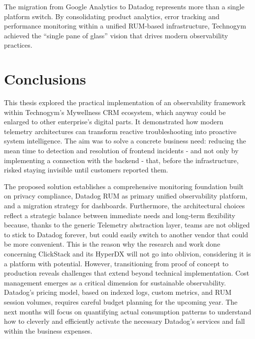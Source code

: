 \documentclass[12pt,a4paper,openright,twoside]{book}
\begin{document}
The migration from Google Analytics to Datadog represents more than a single platform switch. By consolidating product analytics, error tracking and performance monitoring within a unified RUM-based infrastructure, Technogym achieved the ``single pane of glass'' vision that drives modern observability practices. 

\chapter{Conclusions}
This thesis explored the practical implementation of an observability framework within Technogym's Mywellness CRM ecosystem, which anyway could be enlarged to other enterprise's digital parts. It demonstrated how modern telemetry architectures can transform reactive troubleshooting into proactive system intelligence. The aim was to solve a concrete business need: reducing the mean time to detection and resolution of frontend incidents - and not only by implementing a connection with the backend - that, before the infrastructure, risked staying invisible until customers reported them. 

The proposed solution establishes a comprehensive monitoring foundation built on privacy compliance, Datadog RUM as primary unified observability platform, and a migration strategy for dashboards. Furthermore, the architectural choices reflect a strategic balance between immediate needs and long-term flexibility because, thanks to the generic Telemetry abstraction layer, teams are not obliged to stick to Datadog forever, but could easily switch to another vendor that could be more convenient. This is the reason why the research and work done concerning ClickStack and its HyperDX will not go into oblivion, considering it is a platform with potential. However, transitioning from proof of concept to production reveals challenges that extend beyond technical implementation. Cost management emerges as a critical dimension for sustainable observability. Datadog's pricing model, based on indexed logs, custom metrics, and RUM session volumes, requires careful budget planning for the upcoming year. The next months will focus on quantifying actual consumption patterns to understand how to cleverly and efficiently activate the necessary Datadog's services and fall within the business expenses. 
\end{document}
